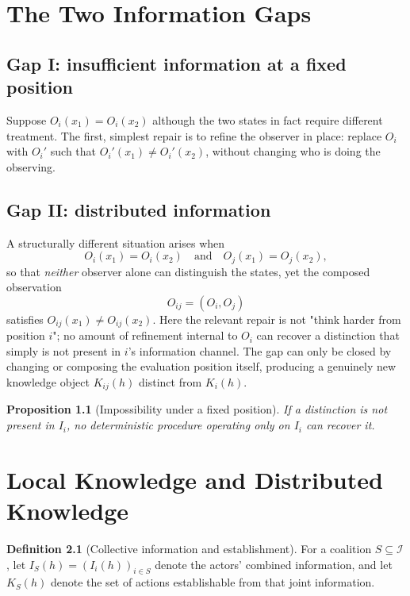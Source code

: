 \documentclass[11pt]{report}
\theoremstyle{definition}
\newtheorem{definition}{Definition}[chapter]
\theoremstyle{plain}
\newtheorem{proposition}[definition]{Proposition}
\newcommand{\Ii}{\mathcal{I}}
\begin{document}
\chapter{The Two Information Gaps}

\section{Gap I: insufficient information at a fixed position}
Suppose $O_i(x_1) = O_i(x_2)$ although the two states in fact require different treatment. The first, simplest repair is to refine the observer in place: replace $O_i$ with $O_i'$ such that $O_i'(x_1) \neq O_i'(x_2)$, without changing who is doing the observing.

\section{Gap II: distributed information}
A structurally different situation arises when
\[
O_i(x_1) = O_i(x_2) \quad\text{and}\quad O_j(x_1) = O_j(x_2),
\]
so that \emph{neither} observer alone can distinguish the states, yet the composed observation
\[
O_{ij} = (O_i, O_j)
\]
satisfies $O_{ij}(x_1) \neq O_{ij}(x_2)$. Here the relevant repair is not "think harder from position $i$"; no amount of refinement internal to $O_i$ can recover a distinction that simply is not present in $i$'s information channel. The gap can only be closed by changing or composing the evaluation position itself, producing a genuinely new knowledge object $K_{ij}(h)$ distinct from $K_i(h)$.

\begin{proposition}[Impossibility under a fixed position]
If a distinction is not present in $I_i$, no deterministic procedure operating only on $I_i$ can recover it.
\end{proposition}

\chapter{Local Knowledge and Distributed Knowledge}

\begin{definition}[Collective information and establishment]
For a coalition $S \subseteq \Ii$, let $I_S(h) = (I_i(h))_{i \in S}$ denote the actors' combined information, and let $K_S(h)$ denote the set of actions establishable from that joint information.
\end{definition}
\end{document}
